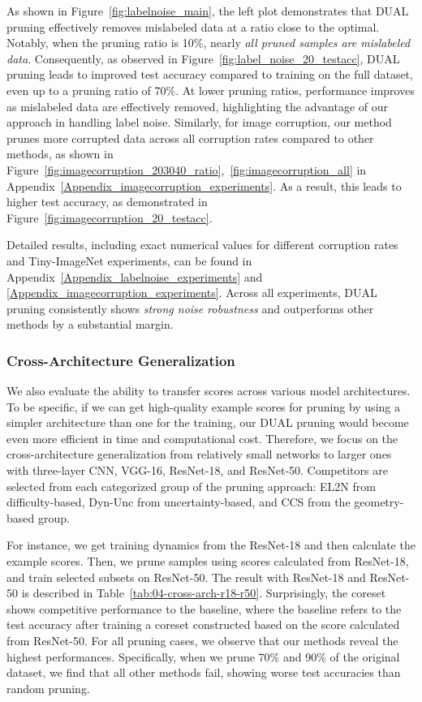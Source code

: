 As shown in Figure~\ref{fig:labelnoise_main}, the left plot demonstrates that DUAL pruning effectively removes mislabeled data at a ratio close to the optimal. Notably, when the pruning ratio is 10\%, nearly \emph{all pruned samples are mislabeled data}.
Consequently, as observed in Figure~\ref{fig:label_noise_20_testacc}, DUAL pruning leads to improved test accuracy compared to training on the full dataset, even up to a pruning ratio of 70\%. At lower pruning ratios, performance improves as mislabeled data are effectively removed, highlighting the advantage of our approach in handling label noise.
Similarly, for image corruption, our method prunes more corrupted data across all corruption rates compared to other methods, as shown in Figure~\ref{fig:imagecorruption_203040_ratio},~\ref{fig:imagecorruption_all} in Appendix~\ref{Appendix_imagecorruption_experiments}. As a result, this leads to higher test accuracy, as demonstrated in Figure~\ref{fig:imagecorruption_20_testacc}. 

Detailed results, including exact numerical values for different corruption rates and Tiny-ImageNet experiments, can be found in Appendix~\ref{Appendix_labelnoise_experiments} and \ref{Appendix_imagecorruption_experiments}.  Across all experiments, DUAL pruning consistently shows \emph{strong noise robustness} and outperforms other methods by a substantial margin.

\subsubsection{Cross-Architecture Generalization}
We also evaluate the ability to transfer scores across various model architectures. To be specific, if we can get high-quality example scores for pruning by using a simpler architecture than one for the training, our DUAL pruning would become even more efficient in time and computational cost. Therefore, we focus on the cross-architecture generalization from relatively small networks to larger ones with three-layer CNN, VGG-16, ResNet-18, and ResNet-50. Competitors are selected from each categorized group of the pruning approach: EL2N from difficulty-based, Dyn-Unc from uncertainty-based, and CCS from the geometry-based group. 

For instance, we get training dynamics from the ResNet-18 and then calculate the example scores. Then, we prune samples using scores calculated from ResNet-18, and train selected subsets on ResNet-50. The result with ResNet-18 and ResNet-50 is described in Table~\ref{tab:04-cross-arch-r18-r50}. Surprisingly, the coreset shows competitive performance to the baseline, where the baseline refers to the test accuracy after training a coreset constructed based on the score calculated from ResNet-50.
For all pruning cases, we observe that our methods reveal the highest performances. Specifically, when we prune 70\% and 90\% of the original dataset, we find that all other methods fail, showing worse test accuracies than random pruning. 


